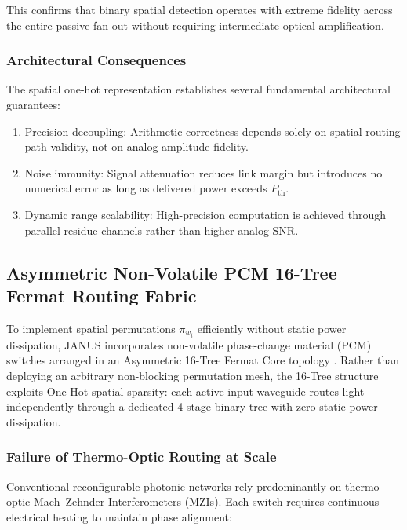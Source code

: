\documentclass[journal]{IEEEtran}
\begin{document}
This confirms that binary spatial detection operates with extreme fidelity across the entire passive fan-out without requiring intermediate optical amplification.

\subsubsection{\textbf{Architectural Consequences}}

The spatial one-hot representation establishes several fundamental architectural guarantees:

\begin{enumerate}
\item Precision decoupling: Arithmetic correctness depends solely on spatial routing path validity, not on analog amplitude fidelity.
\item Noise immunity: Signal attenuation reduces link margin but introduces no numerical error as long as delivered power exceeds $P_{\mathrm{th}}$.
\item Dynamic range scalability: High-precision computation is achieved through parallel residue channels rather than higher analog SNR.
\end{enumerate}

\subsection{\textbf{Asymmetric Non-Volatile PCM 16-Tree Fermat Routing Fabric}}

To implement spatial permutations $\pi_{w_i}$ efficiently without static power dissipation, JANUS incorporates non-volatile phase-change material (PCM) switches arranged in an Asymmetric 16-Tree Fermat Core topology \cite{Fang2022}\cite{Zhang2021}\cite{Wuttig2017}\cite{Sinatkas2021}. Rather than deploying an arbitrary non-blocking permutation mesh, the 16-Tree structure exploits One-Hot spatial sparsity: each active input waveguide routes light independently through a dedicated 4-stage binary tree with zero static power dissipation.

\subsubsection{\textbf{Failure of Thermo-Optic Routing at Scale}}

Conventional reconfigurable photonic networks rely predominantly on thermo-optic Mach--Zehnder Interferometers (MZIs). Each switch requires continuous electrical heating to maintain phase alignment:
\end{document}
